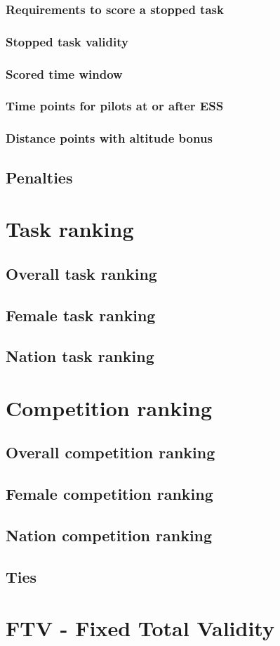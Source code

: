 \documentclass{article}
\begin{document}
\subsubsection{Requirements to score a stopped task}
\subsubsection{Stopped task validity}
\subsubsection{Scored time window}
\subsubsection{Time points for pilots at or after ESS}
\subsubsection{Distance points with altitude bonus}
\subsection{Penalties}

\newpage
\section{Task ranking}
\subsection{Overall task ranking}
\subsection{Female task ranking}
\subsection{Nation task ranking}

\newpage
\section{Competition ranking}
\subsection{Overall competition ranking}
\subsection{Female competition ranking}
\subsection{Nation competition ranking}
\subsection{Ties}

\newpage
\section{FTV - Fixed Total Validity}
\end{document}
